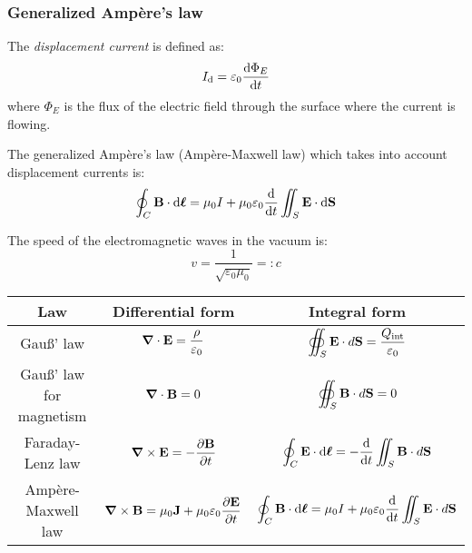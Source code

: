 \documentclass[../../../main.tex]{subfiles}
\begin{document}
\begin{multicols}{2}
  \subsubsection*{Generalized Ampère's law}
  \begin{definition}
    The \textit{displacement current} is defined as: $$I_\text{d}=\varepsilon_0\dv{\Phi_E}{t}$$ where $\Phi_E$ is the flux of the electric field through the surface where the current is flowing.
  \end{definition}
  \begin{law}
    The generalized Ampère's law (Ampère-Maxwell law) which takes into account displacement currents is: $$\oint_C\vb{B}\cdot \dd\vb*{\ell}=\mu_0 I+\mu_0\varepsilon_0\dv{}{t}\iint_S\vb{E}\cdot \dd\vb{S}$$
  \end{law}
  \begin{definition}
    The speed of the electromagnetic waves in the vacuum is: $$v=\frac{1}{\sqrt{\varepsilon_0\mu_0}}=:c$$
  \end{definition}
\end{multicols}
\begin{table}[ht]
  \centering
  \renewcommand{\arraystretch}{2.5}
  \begin{tabular}{|c|c|c|}
    \hline
    \bfseries Law             & \bfseries Differential form                                                                                                        & \bfseries Integral form                                                                                                            \\
    \hline
    Gau\ss' law               & $\displaystyle \vb{\grad}\cdot\vb{E}=\frac{\rho}{\varepsilon_0}$                                                     & $\displaystyle \oiint_S\vb{E}\cdot d\vb{S}=\frac{Q_{\text{int}}}{\varepsilon_0}$                                     \\
    \hline
    Gau\ss' law for magnetism & $\displaystyle \vb{\grad}\cdot\vb{B}=0$                                                                              & $\displaystyle \oiint_S\vb{B}\cdot d\vb{S}=0$                                                                        \\
    \hline
    Faraday-Lenz law          & $\displaystyle \vb{\grad}\times\vb{E}=-\frac{\partial\vb{B}}{\partial t}$                                     & $\displaystyle \oint_C\vb{E}\cdot \dd\vb*{\ell}=-\dv{}{t}\iint_S\vb{B}\cdot d\vb{S}$                          \\
    \hline
    Ampère-Maxwell law        & $\displaystyle \vb{\grad}\times\vb{B}=\mu_0\vb{J}+\mu_0\varepsilon_0\frac{\partial\vb{E}}{\partial t}$ & $\displaystyle \oint_C\vb{B}\cdot \dd\vb*{\ell}=\mu_0 I+\mu_0\varepsilon_0\dv{}{t}\iint_S\vb{E}\cdot d\vb{S}$ \\
    \hline
  \end{tabular}
\end{table}
\end{document}
